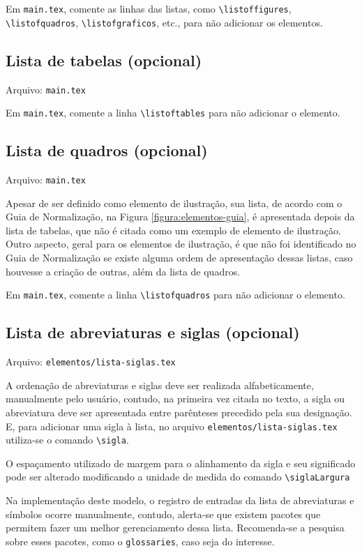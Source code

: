     Em \texttt{main.tex}, comente as linhas das listas, como \verb|\listoffigures|, \\\verb|\listofquadros|, \verb|\listofgraficos|, etc., para não adicionar os elementos.

\subsection{Lista de tabelas (opcional)}
    Arquivo: \texttt{main.tex}

    Em \texttt{main.tex}, comente a linha \verb|\listoftables| para não adicionar o elemento.

\subsection{Lista de quadros (opcional)}
    Arquivo: \texttt{main.tex}

    Apesar de ser definido como elemento de ilustração, sua lista, de acordo com o Guia de Normalização, na Figura \ref{figura:elementos-guia}, é apresentada depois da lista de tabelas, que não é citada como um exemplo de elemento de ilustração. Outro aspecto, geral para os elementos de ilustração, é que não foi identificado no Guia de Normalização se existe alguma ordem de apresentação dessas listas, caso houvesse a criação de outras, além da lista de quadros.

    Em \texttt{main.tex}, comente a linha \verb|\listofquadros| para não adicionar o elemento.

\subsection{Lista de abreviaturas e siglas (opcional)}
    Arquivo: \texttt{elementos/lista-siglas.tex}

    A ordenação de abreviaturas e siglas deve ser realizada alfabeticamente, manualmente pelo usuário, contudo, na primeira vez citada no texto, a sigla ou abreviatura deve ser apresentada entre parênteses precedido pela sua designação. E, para adicionar uma sigla à lista, no arquivo \texttt{elementos/lista-siglas.tex} utiliza-se o comando \verb|\sigla|.

    O espaçamento utilizado de margem para o alinhamento da sigla e seu significado pode ser alterado modificando a unidade de medida do comando \verb|\siglaLargura|

    Na implementação deste modelo, o registro de entradas da lista de abreviaturas e símbolos ocorre manualmente, contudo, alerta-se que existem pacotes que permitem fazer um melhor gerenciamento dessa lista. Recomenda-se a pesquisa sobre esses pacotes, como o \texttt{glossaries}, caso seja do interesse.

